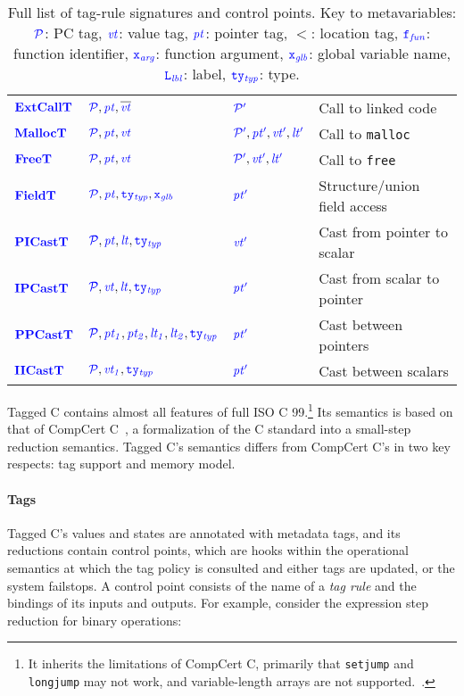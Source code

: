 \documentclass{llncs}
\begin{document}
\begin{table}[t]
\begin{tabular}{|l|l|l|l|}
    \(\extcalltname\)   & \(\extcalltargs\)      & \(\extcalltres\)   & Call to linked code \\
    \(\malloctname\)    & \(\malloctargs\)       & \(\malloctres\)    & Call to {\tt malloc} \\
    \(\freetname\)      & \(\freetargs\)         & \(\freetres\)      & Call to {\tt free} \\
    \(\fieldtname\)     & \(\fieldtargs\)        & \(\fieldtres\)     & Structure/union field access \\
    \(\picasttname\)    & \(\picasttargs\)       & \(\picasttres\)    & Cast from pointer to scalar \\
    \(\ipcasttname\)    & \(\ipcasttargs\)       & \(\ipcasttres\)    & Cast from scalar to pointer \\
    \(\ppcasttname\)    & \(\ppcasttargs\)       & \(\ppcasttres\)    & Cast between pointers \\
    \(\iicasttname\)    & \(\iicasttargs\)       & \(\iicasttres\)    & Cast between scalars \\
    \hline
  \end{tabular}

  \caption{Full list of tag-rule signatures and control points. Key to metavariables:
    \(\PCT\): PC tag, \(\vt\): value tag, \(\pt\): pointer tag, \(\lt\): location tag,
    \(\FN\): function identifier, \(\AN\): function argument, \(\GN\): global
    variable name, \(\LN\): label, \(\TN\): type.}
  \label{fig:controlpoints}
\end{table}

Tagged C contains almost all features of full ISO C 99.\footnote{
It inherits the limitations of CompCert C, primarily that {\tt setjump} and {\tt longjump}
may not work, and variable-length arrays are not supported.~\cite[Ch. 5]{Leroy22:CompCertManual}.}
Its semantics is based on that of CompCert C~\cite{Leroy09:CompCert},
a formalization of the C standard into a small-step reduction semantics.
Tagged C's semantics differs from CompCert C's in two key respects: tag support and memory model.

\paragraph{Tags}
Tagged C's values
and states are annotated with metadata tags, and its reductions contain
control points, which are hooks within the
operational semantics at which the tag policy is consulted and either tags are updated, or the system
failstops. A control point consists of the name of a {\em tag rule}
and the bindings of its inputs and outputs. For example, consider the expression step reduction
for binary operations:
\end{document}

